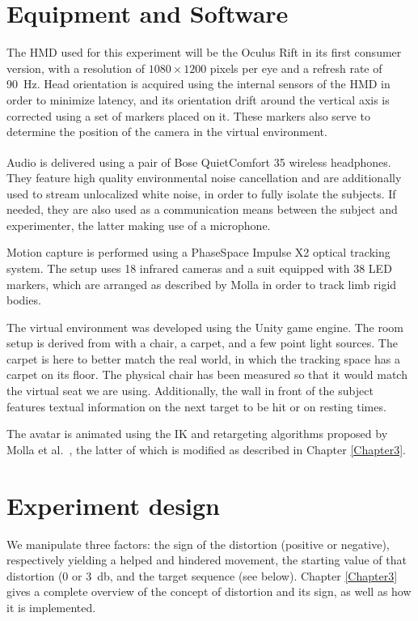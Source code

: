 \section{Equipment and Software}

The HMD used for this experiment will be the Oculus Rift in its first consumer version, with a resolution of $1080 \times 1200$ pixels per eye and a refresh rate of \SI{90}{\hertz}. Head orientation is acquired using the internal sensors of the HMD in order to minimize latency, and its orientation drift around the vertical axis is corrected using a set of markers placed on it. These markers also serve to determine the position of the camera in the virtual environment.

Audio is delivered using a pair of Bose\textsuperscript{\textregistered} QuietComfort 35 wireless headphones. They feature high quality environmental noise cancellation and are additionally used to stream unlocalized white noise, in order to fully isolate the subjects. If needed, they are also used as a communication means between the subject and experimenter, the latter making use of a microphone.

Motion capture is performed using a PhaseSpace Impulse X2 optical tracking system. The setup uses 18 infrared cameras and a suit equipped with 38 LED markers, which are arranged as described by Molla \cite{molla2016precise} in order to track limb rigid bodies.

The virtual environment was developed using the Unity game engine. The room setup is derived from \cite{debarba2017embodiment} with a chair, a carpet, and a few point light sources. The carpet is here to better match the real world, in which the tracking space has a carpet on its floor. The physical chair has been measured so that it would match the virtual seat we are using. Additionally, the wall in front of the subject features textual information on the next target to be hit or on resting times.

The avatar is animated using the IK and retargeting algorithms proposed by Molla et al.\ \cite{molla2013singularity,molla2017egocentric}, the latter of which is modified as described in Chapter \ref{Chapter3}.

\section{Experiment design}

We manipulate three factors: the sign of the distortion (positive or negative), respectively yielding a helped and hindered movement, the starting value of that distortion (\num{0} or \SI{3}{\decibel}, and the target sequence (see below). Chapter \ref{Chapter3} gives a complete overview of the concept of distortion and its sign, as well as how it is implemented.

